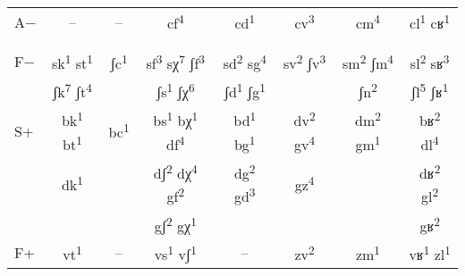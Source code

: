 \begin{table}
{\begin{tabular}{lccccccc}
{A−} & 
{--} & 
{--} & 
{cf\textsuperscript{4}} & 
{\cellcolor[rgb]{.73,.84,1}cd\textsuperscript{1}} & 
{\cellcolor[rgb]{.73,.84,1}cv\textsuperscript{3}} & 
{cm\textsuperscript{4}} & 
{cl\textsuperscript{1} cʁ\textsuperscript{1}} \\

& \multicolumn{3}{c}{} & \multicolumn{2}{c}{} & \multicolumn{2}{c}{}\\

& \multicolumn{3}{c}{} & \multicolumn{2}{c}{} & \multicolumn{2}{c}{}\\

{F−} & 
{sk\textsuperscript{1} st\textsuperscript{1}} & 
{ʃc\textsuperscript{1}} & 
{sf\textsuperscript{3} sχ\textsuperscript{7} ʃf\textsuperscript{3}} & 
{\cellcolor[rgb]{.73,.84,1}sd\textsuperscript{2} sg\textsuperscript{4}} & 
{\cellcolor[rgb]{.73,.84,1}sv\textsuperscript{2} ʃv\textsuperscript{3}} & 
{sm\textsuperscript{2} ʃm\textsuperscript{4}} & 
{sl\textsuperscript{2} sʁ\textsuperscript{3}}\\

& {ʃk\textsuperscript{7} ʃt\textsuperscript{4}} & 
{} & 
{ʃs\textsuperscript{1} ʃχ\textsuperscript{6}} & 
{\cellcolor[rgb]{.73,.84,1}ʃd\textsuperscript{1} ʃg\textsuperscript{1}} & 
{} & 
{ʃn\textsuperscript{2}} & 
{ʃl\textsuperscript{5} ʃʁ\textsuperscript{1}}\\

{S+} & 
{\cellcolor[rgb]{.95,.73,1}bk\textsuperscript{1} bt\textsuperscript{1}} & 
{\cellcolor[rgb]{.95,.73,1}bc\textsuperscript{1}} & 
{\cellcolor[rgb]{.95,.73,1}bs\textsuperscript{1} bχ\textsuperscript{1} df\textsuperscript{4}} & 
{bd\textsuperscript{1} bg\textsuperscript{1}} & 
{dv\textsuperscript{2} gv\textsuperscript{4}} & 
{dm\textsuperscript{2} gm\textsuperscript{1}} & 
{bʁ\textsuperscript{2} dl\textsuperscript{4}}\\

& {\cellcolor[rgb]{.95,.73,1}dk\textsuperscript{1}} & & 
{\cellcolor[rgb]{.95,.73,1}dʃ\textsuperscript{2} dχ\textsuperscript{4} gf\textsuperscript{2}} & 
{dg\textsuperscript{2} gd\textsuperscript{3}} & 
{gz\textsuperscript{4}} & & 
{dʁ\textsuperscript{2} gl\textsuperscript{2}}\\

& & & {\cellcolor[rgb]{.95,.73,1}gʃ\textsuperscript{2} gχ\textsuperscript{1}} & & & & 
{gʁ\textsuperscript{2}}\\

{F+} & 
{\cellcolor[rgb]{.95,.73,1}vt\textsuperscript{1}} & 
{--} & 
{\cellcolor[rgb]{.95,.73,1}vs\textsuperscript{1} vʃ\textsuperscript{1}} & 
{--} & 
{zv\textsuperscript{2}} & 
{zm\textsuperscript{1}} & 
{vʁ\textsuperscript{1} zl\textsuperscript{1}}\\


\end{tabular}}
\end{table}
